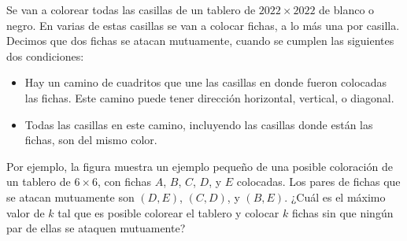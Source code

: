 Se van a colorear todas las casillas de un tablero de $2022\times 2022$ de blanco o negro. En varias de estas casillas se van a colocar fichas, a lo más una por casilla. Decimos que dos fichas se atacan mutuamente, cuando se cumplen las siguientes dos condiciones:
 \begin{itemize} 
 \item  Hay un camino de cuadritos que une las casillas en donde fueron colocadas las fichas. Este camino puede tener dirección horizontal, vertical, o diagonal. 
 \item  Todas las casillas en este camino, incluyendo las casillas donde están las fichas, son del mismo color.
 \end{itemize} 
Por ejemplo, la figura muestra un ejemplo pequeño de una posible coloración de un tablero de $6\times 6$, con fichas $A$, $B$, $C$, $D$, y $E$ colocadas. Los pares de fichas que se atacan mutuamente son $(D,E)$, $(C,D)$, y $(B,E)$.  \newline  
¿Cuál es el máximo valor de $k$ tal que es posible colorear el tablero y colocar $k$ fichas sin que ningún par de ellas se ataquen mutuamente?